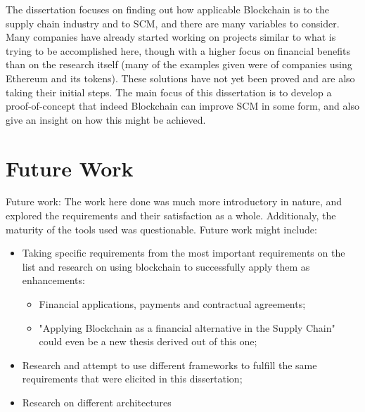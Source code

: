 The dissertation focuses on finding out how applicable Blockchain is to the supply chain industry and to SCM, and there are many variables to consider. Many companies have already started working on projects similar to what is trying to be accomplished here, though with a higher focus on financial benefits than on the research itself (many of the examples given were of companies using Ethereum and its tokens). These solutions have not yet been proved and are also taking their initial steps. The main focus of this dissertation is to develop a proof-of-concept that indeed Blockchain can improve SCM in some form, and also give an insight on how this might be achieved. 

\section{Future Work}

Future work: The work here done was much more introductory in nature, and explored the requirements and their satisfaction as a whole. Additionaly, the maturity of the tools used was questionable. 
Future work might include:
\begin{itemize}
	\item Taking specific requirements from the most important requirements on the list and research on using blockchain to successfully apply them as enhancements:
	\begin{itemize}
		\item Financial applications, payments and contractual agreements;
		\item "Applying Blockchain as a financial alternative in the Supply Chain" could even be a new thesis derived out of this one;
	\end{itemize}
	\item Research and attempt to use different frameworks to fulfill the same requirements that were elicited in this dissertation;
    \item Research on different architectures
\end{itemize} 


%

